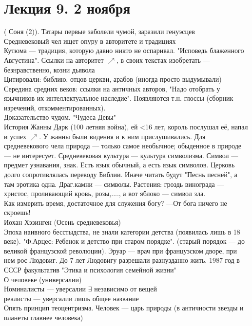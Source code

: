 \documentclass[a4paper,12pt]{article}
\begin{document}
\section{Лекция 9. 2 ноября}
( Соня (2)). Татары первые заболели чумой, заразили генуэсцев\\
Средневековый чел ищет опуру в авторитете и традициях\\
Кутюма --- традиция, которую давно никто не оспаривал. "Исповедь блаженного Августина". Ссылки на авторитет $\nearrow$, в своих текстах изобретать --- безнравственно, козни дьявола\\
Цитировали: библию, отцов церкви, арабов (иногда просто выдумывали)\\
Середина средних веков: ссылки на античных авторов, "Надо отобрать у язычников их интеллектуальное наследие". Появляются т.н. глоссы (сборник изречений, откомментированных). \\
Доказательство чудом. "Чудеса Девы"\\
История Жанны Дарк (100 летняя война), ей <16 лет, король послушал её, напал и успех $\nearrow$. У жанны были видения и к ним прислушивались. Для средневекового чела природа --- только самое необычное; обыденное в природе --- не интересует. Средневековая культура --- культура символизма. Символ --- предмет узнавания, знак. Есть язык обычный, а есть язык символов. Церковь долго сопротивлялась переводу Библии. Иначе читать будут "Песнь песней", а там эротика одна. Драг.камни --- символы. Растения: гроздь винограда --- христос, проливающий кровь, розы,...., а вот яблоко --- символ зла.\\
Как измерить время, достаточное для служения богу? ---От бога ничего не скроешь!\\
Иохан Хэзинген (Осень средневековья)\\
Эпоха наивного бесстыдства, не знали категории детства (появилась лишь в 18 веке). "Ф.Арцес: Ребенок и детство при старом порядке". (старый порядок --- до великой французской революции). Эруар --- врач при французском дворе, при нем рос Людовиг. До 7 лет Людовигу разрешали разнузданно жить. 1987 год в СССР факультатив "Этика и психология семейной жизни"\\
О человеке (универсалии)\\
Номиналисты --- уверсалии $\exists$ независимо от вещей\\
реалисты --- уверсалии лишь общее название\\
Опять принцип теоцентризма. Человек --- царь природы (в античности звезды и планеты главнее человека)\\
\end{document}

